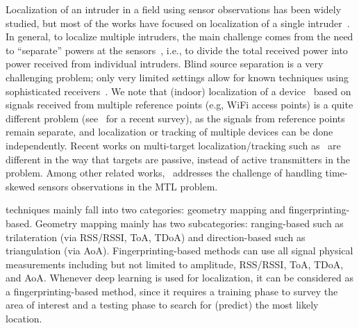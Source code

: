  Localization of an intruder in a field using sensor observations has been widely studied, but most of the works have focused on
localization of a single intruder~\cite{infocom18-spectrum,dutta2016see}.
In general, to localize multiple intruders, the main challenge comes
from the need to ``separate'' powers at the sensors~\cite{mobicom-30},
i.e., to divide the total received power into power received from
individual intruders. Blind source separation is a very challenging
problem; only very limited settings allow for known
techniques using sophisticated receivers~\cite{freq-sig,ben-zhao}.
We note that (indoor) localization of a
  device~\cite{infocom00-radar} based on signals received from multiple reference points (e.g, WiFi access
  points) is a quite different problem
  (see~\cite{zafari-19} for a recent survey), as the signals from
  reference points remain separate, and localization or tracking of multiple
  devices can be done independently.
  Recent works on multi-target localization/tracking such as~\cite{ipsn19-multipassive} are different in the way that targets are passive, instead of active transmitters in the \mtl problem.
Among other related works,~\cite{multi-tx-dyspan-19} addresses the challenge of handling time-skewed sensors observations in the MTL problem.

 techniques mainly fall into two categories: geometry mapping and fingerprinting-based.
Geometry mapping mainly has two subcategories: ranging-based such as trilateration (via RSS/RSSI, ToA, TDoA) and direction-based such as triangulation (via AoA).
Fingerprinting-based methods can use all signal physical measurements including but not limited to amplitude, RSS/RSSI, ToA, TDoA, and AoA.
Whenever deep learning is used for localization, it can be considered as a fingerprinting-based method, since it requires a 
training phase to survey the area of interest and a testing phase to search for (predict) the most likely location.

